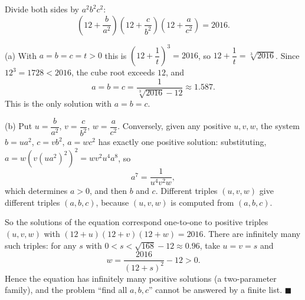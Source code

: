 Divide both sides by $a^2b^2c^2$:
\[
\left(12+\dfrac{b}{a^2}\right)\left(12+\dfrac{c}{b^2}\right)\left(12+\dfrac{a}{c^2}\right)=2016. \tag{$*$}
\]

(a) With $a=b=c=t>0$ this is $\left(12+\dfrac{1}{t}\right)^3=2016$, so $12+\dfrac{1}{t}=\sqrt[3]{2016}$. Since $12^3=1728<2016$, the cube root exceeds $12$, and
\[
\boxed{a=b=c=\dfrac{1}{\sqrt[3]{2016}-12}}\approx1.587 .
\]
This is the only solution with $a=b=c$.

(b) Put $u=\dfrac {b}{a^2}$, $v=\dfrac {c}{b^2}$, $w=\dfrac {a}{c^2}$. Conversely, given any positive $u,v,w$, the system $b=ua^2$, $c=vb^2$, $a=wc^2$ has exactly one positive solution: substituting, $a=w\left(v\left(ua^2\right)^2\right)^2=wv^2u^4a^8$, so
\[
a^7=\dfrac{1}{u^4v^2w},
\]
which determines $a>0$, and then $b$ and $c$. Different triples $(u,v,w)$ give different triples $(a,b,c)$, because $(u,v,w)$ is computed from $(a,b,c)$.

So the solutions of the equation correspond one-to-one to positive triples $(u,v,w)$ with $(12+u)(12+v)(12+w)=2016$. There are infinitely many such triples: for any $s$ with $0<s<\sqrt{168}-12\approx0.96$, take $u=v=s$ and
\[
w=\dfrac{2016}{(12+s)^2}-12>0 .
\]
Hence the equation has infinitely many positive solutions (a two-parameter family), and the problem ``find all $a,b,c$'' cannot be answered by a finite list. $\blacksquare$
